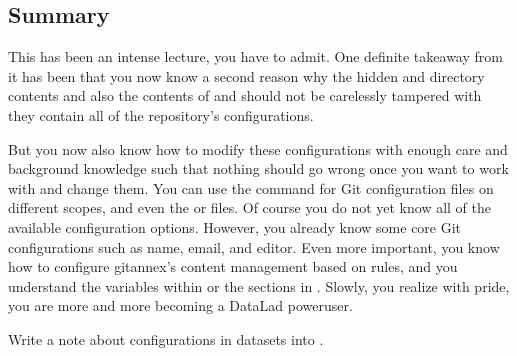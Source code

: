 \subsection{Summary}
\label{\detokenize{basics/101-123-config2:summary}}
\sphinxAtStartPar
This has been an intense lecture, you have to admit. One definite
take\sphinxhyphen{}away from it has been that you now know a second reason why the hidden
 and  directory contents and also the contents of  and
 should not be carelessly tampered with \textendash{} they contain all of
the repository’s configurations.

\sphinxAtStartPar
But you now also know how to modify these configurations with enough
care and background knowledge such that nothing should go wrong once you
want to work with and change them. You can use the  command
for Git configuration files on different scopes, and even the  or 
files. Of course you do not yet know all of the available configuration options. However,
you already know some core Git configurations such as name, email, and editor. Even more
important, you know how to configure git\sphinxhyphen{}annex’s content management based on 
rules, and you understand the  variables within  or the sections
in . Slowly, you realize with pride,
you are more and more becoming a DataLad power\sphinxhyphen{}user.

\sphinxAtStartPar
Write a note about configurations in datasets into .

